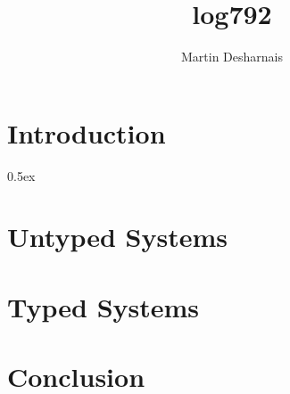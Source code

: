 \documentclass[11pt,a4paper]{report}
\begin{document}
\title{log792}
\author{Martin Desharnais}

\maketitle

\tableofcontents

\cleardoublepage{}
\pagestyle{headings}

\part{Introduction}




\parindent 0pt\parskip 0.5ex

\part{Untyped Systems}




\part{Typed Systems}



\part{Conclusion}


%
%
\end{document}
